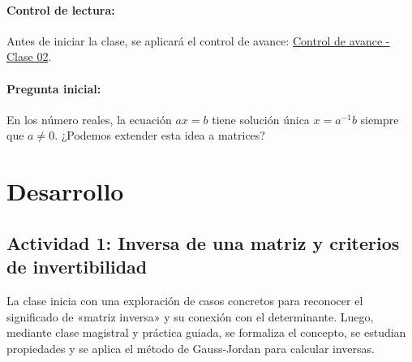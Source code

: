 \documentclass[a4,11pt]{aleph-notas}
\begin{document}
\paragraph{Control de lectura:}
Antes de iniciar la clase, se aplicará el control de avance:
\href{https://gemini.google.com/share/773ea3fbeaf3}{Control de avance - Clase 02}.

\paragraph{Pregunta inicial:}
En los número reales, la ecuación $ax=b$ tiene solución única $x=a^{-1}b$ siempre que $a\neq 0$. ¿Podemos extender esta idea a matrices? 

\section*{Desarrollo}

\subsection*{Actividad 1: Inversa de una matriz y criterios de invertibilidad}

La clase inicia con una exploración de casos concretos para reconocer el significado de «matriz inversa» y su conexión con el determinante. Luego, mediante clase magistral y práctica guiada, se formaliza el concepto, se estudian propiedades y se aplica el método de Gauss-Jordan para calcular inversas.
\end{document}
